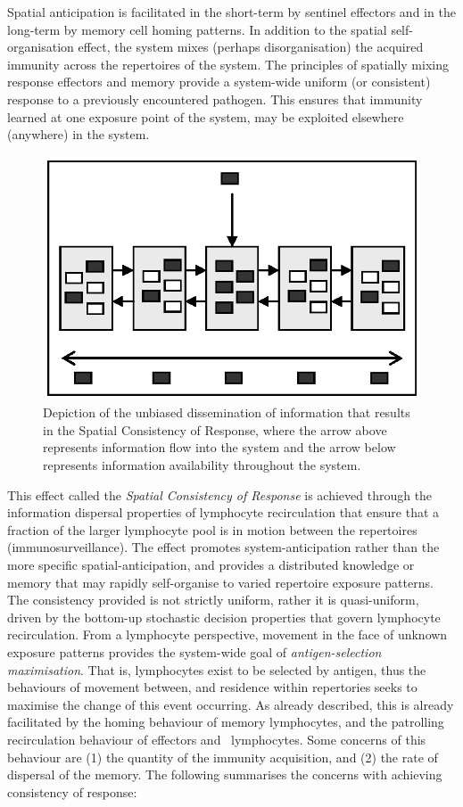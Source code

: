 Spatial anticipation is facilitated in the short-term by sentinel effectors and in the long-term by memory cell homing patterns. In addition to the spatial self-organisation effect, the system mixes (perhaps disorganisation) the acquired immunity across the repertoires of the system. The principles of spatially mixing response effectors and memory provide a system-wide uniform (or consistent) response to a previously encountered pathogen. This ensures that immunity learned at one exposure point of the system, may be exploited elsewhere (anywhere) in the system.

\begin{figure}[ht]
	\centering
	\includegraphics[scale=0.75]{Tissues/tissues-effects-consistent}
	\caption{Depiction of the unbiased dissemination of information that results in the Spatial Consistency of Response, where the arrow above represents information flow into the system and the arrow below represents information availability throughout the system.}
	\label{fig:tissues:effects:consistent}
\end{figure}

This effect called the \emph{Spatial Consistency of Response} is achieved through the information dispersal properties of lymphocyte recirculation that ensure that a fraction of the larger lymphocyte pool is in motion between the repertoires (immunosurveillance). The effect promotes system-anticipation rather than the more specific spatial-anticipation, and provides a distributed knowledge or memory that may rapidly self-organise to varied repertoire exposure patterns. The consistency provided is not strictly uniform, rather it is quasi-uniform, driven by the bottom-up stochastic decision properties that govern lymphocyte recirculation. From a lymphocyte perspective, movement in the face of unknown exposure patterns provides the system-wide goal of \emph{antigen-selection maximisation}. That is, lymphocytes exist to be selected by antigen, thus the behaviours of movement between, and residence within repertories seeks to maximise the change of this event occurring. As already described, this is already facilitated by the homing behaviour of memory lymphocytes, and the patrolling recirculation behaviour of effectors and \naive\ lymphocytes. Some concerns of this behaviour are (1) the quantity of the immunity acquisition, and (2) the rate of dispersal of the memory. The following summarises the concerns with achieving consistency of response:

